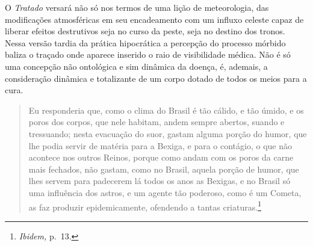 O \textit{Tratado} versará não só nos termos de uma lição de meteorologia,
das modificações atmosféricas em seu encadeamento com um influxo celeste
capaz de liberar efeitos destrutivos seja no curso da peste, seja no
destino dos tronos. Nessa versão tardia da prática hipocrática a
percepção do processo mórbido baliza o traçado onde aparece inserido o
raio de visibilidade médica. Não é só uma concepção não ontológica e sim
dinâmica da doença, é, ademais, a consideração dinâmica e totalizante de
um corpo dotado de todos os meios para a cura.

\begin{quote}
Eu responderia que, como o clima do Brasil é tão cálido, e tão úmido, e
os poros dos corpos, que nele habitam, andem sempre abertos, suando e
tressuando; nesta evacuação do suor, gastam alguma porção do humor, que
lhe podia servir de matéria para a Bexiga, e para o contágio, o que não
acontece nos outros Reinos, porque como andam com os poros da carne mais
fechados, não gastam, como no Brasil, aquela porção de humor, que lhes
servem para padecerem lá todos os anos as Bexigas, e no Brasil só uma
influência dos astros, e um agente tão poderoso, como é um Cometa, as
faz produzir epidemicamente, ofendendo a tantas criaturas.\footnote{\textit{Ibidem,}
  p.~13.}
\end{quote}

